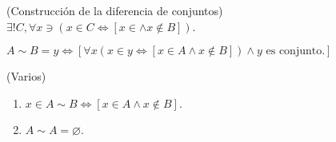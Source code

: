 \begin{teorema}(Construcción de la diferencia de conjuntos)
	$\exists ! C, \forall x \ni (x\in C\iff [x\in \wedge x\not\in B])$.
\end{teorema}

\begin{definicion}
	$A\sim B = y\iff \left[\forall x(x\in y\iff [x\in A\wedge x\not\in B])\wedge y \text{ es conjunto.}\right]$
\end{definicion}

\begin{teorema}(Varios)
	\begin{enumerate}
		\item $x\in A \sim B\iff [x\in A\wedge x\not\in B]$. 
		\item $A\sim A=\varnothing$. 
	\end{enumerate}
\end{teorema}
